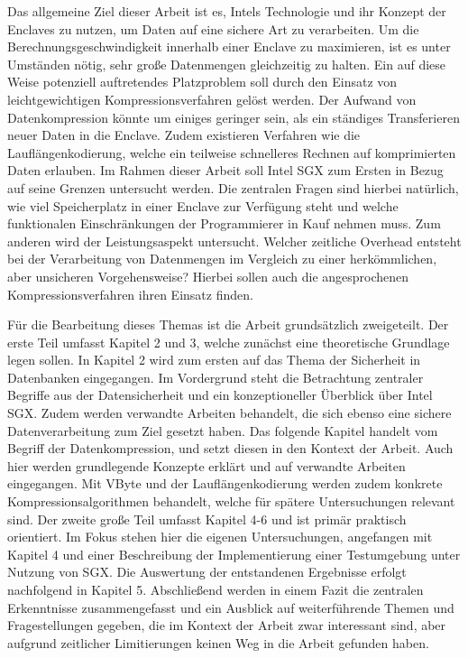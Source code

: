 Das allgemeine Ziel dieser Arbeit ist es, Intels Technologie und ihr Konzept der Enclaves zu nutzen, um Daten auf eine sichere Art zu verarbeiten. Um die Berechnungsgeschwindigkeit innerhalb einer Enclave zu maximieren, ist es unter Umständen nötig, sehr große Datenmengen gleichzeitig zu halten. Ein auf diese Weise potenziell auftretendes Platzproblem soll durch den Einsatz von leichtgewichtigen Kompressionsverfahren gelöst werden. Der Aufwand von Datenkompression könnte um einiges geringer sein, als ein ständiges Transferieren neuer Daten in die Enclave. Zudem existieren Verfahren wie die Lauflängenkodierung, welche ein teilweise schnelleres Rechnen auf komprimierten Daten erlauben. Im Rahmen dieser Arbeit soll Intel SGX zum Ersten in Bezug auf seine Grenzen untersucht werden. Die zentralen Fragen sind hierbei natürlich, wie viel Speicherplatz in einer Enclave zur Verfügung steht und welche funktionalen Einschränkungen der Programmierer in Kauf nehmen muss. Zum anderen wird der Leistungsaspekt untersucht. Welcher zeitliche Overhead entsteht bei der Verarbeitung von Datenmengen im Vergleich zu einer herkömmlichen, aber unsicheren Vorgehensweise? Hierbei sollen auch die angesprochenen Kompressionsverfahren ihren Einsatz finden. %

Für die Bearbeitung dieses Themas ist die Arbeit grundsätzlich zweigeteilt. Der erste Teil umfasst Kapitel 2 und 3, welche zunächst eine theoretische Grundlage legen sollen. In Kapitel 2 wird zum ersten auf das Thema der Sicherheit in Datenbanken eingegangen. Im Vordergrund steht die Betrachtung zentraler Begriffe aus der Datensicherheit und ein konzeptioneller Überblick über Intel SGX. Zudem werden verwandte Arbeiten behandelt, die sich ebenso eine sichere Datenverarbeitung zum Ziel gesetzt haben. Das folgende Kapitel handelt vom Begriff der Datenkompression, und setzt diesen in den Kontext der Arbeit. Auch hier werden grundlegende Konzepte erklärt und auf verwandte Arbeiten eingegangen. Mit VByte und der Lauflängenkodierung werden zudem konkrete Kompressionsalgorithmen behandelt, welche für spätere Untersuchungen relevant sind. Der zweite große Teil umfasst Kapitel 4-6 und ist primär praktisch orientiert. Im Fokus stehen hier die eigenen Untersuchungen, angefangen mit Kapitel 4 und einer Beschreibung der Implementierung einer Testumgebung unter Nutzung von SGX. Die Auswertung der entstandenen Ergebnisse erfolgt nachfolgend in Kapitel 5. Abschließend werden in einem Fazit die zentralen Erkenntnisse zusammengefasst und ein Ausblick auf weiterführende Themen und Fragestellungen gegeben, die im Kontext der Arbeit zwar interessant sind, aber aufgrund zeitlicher Limitierungen keinen Weg in die Arbeit gefunden haben.

